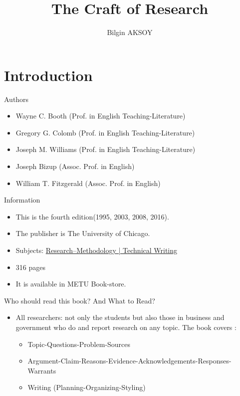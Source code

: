 \documentclass{beamer}
\title[The Craft of Research]{The Craft of Research}
\author{Bilgin AKSOY}
\institute{Informatics Institute}
\begin{document}
	\begin{frame}
	  \titlepage
	\end{frame}

\section{Introduction}
	\begin{frame}
	\begin{block}{Authors}
	\end{block}
		\begin{itemize}
			\item Wayne C. Booth (Prof. in English Teaching-Literature)
			\item Gregory G. Colomb (Prof. in English Teaching-Literature)
			\item Joseph M. Williams (Prof. in English Teaching-Literature)
			\item Joseph Bizup (Assoc. Prof. in English)
			\item William T. Fitzgerald (Assoc. Prof. in English)
		\end{itemize}			 
	\end{frame}
	\begin{frame}{Information}
		\begin{itemize}
			\item This is the fourth edition(1995, 2003, 2008, 2016).
			\item The publisher is The University of Chicago. 
			\item Subjects: \href{http://library.metu.edu.tr/search~S4/?searchtype=d&searcharg=research+methodolgy&searchscope=4&sortdropdown=-&SORT=DZ&extended=0&SUBMIT=Search&searchlimits=&searchorigarg=Xreaerch+methodolgy}{Research--Methodology | Technical Writing}
			\item 316 pages
			\item It is available in METU Book-store.
		\end{itemize}
	\end{frame}
	
	\setbeamercovered{transparent}
	\begin{frame}{Who should read this book? And What to Read?}
		\begin{itemize}
			\item All researchers: not only the students but also those in business and government who do and report research on any topic. The book covers :
			\begin{itemize}
				 \item Topic-Questions-Problem-Sources
				\onslide<2-> \item Argument-Claim-Reasons-Evidence-Acknowledgements-Responses-Warrants
				\onslide<3-> \item Writing (Planning-Organizing-Styling)
			\end{itemize}
		\end{itemize}	
	\end{frame}
	
\end{document}
